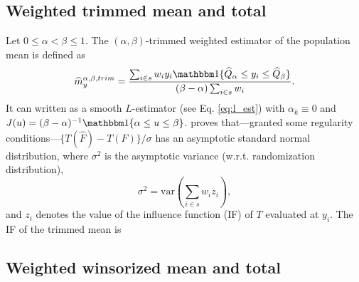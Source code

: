 \documentclass[a4paper,oneside,11pt,DIV=12]{scrartcl}
\newcommand{\indicator}{{\mathbbm 1}}   %
\theoremstyle{remark}
\begin{document}
\subsection{Weighted trimmed mean and total}
Let $0 \leq \alpha < \beta \leq 1$. The $(\alpha, \beta)$-trimmed weighted estimator of the population mean is defined as
\begin{equation*}
  \widehat{m}_y^{\alpha,\beta, trim} = \frac{\sum_{i \in s} w_i y_i \indicator \{\widehat{Q}_{\alpha} \leq y_i \leq \widehat{Q}_{\beta} \}}{(\beta - \alpha)\sum_{i \in s}w_i}.
\end{equation*}
\noindent It can written as a smooth $L$-estimator (see Eq. \ref{eq:l_est}) with $\alpha_k \equiv 0$ and $J(u) = (\beta - \alpha)^{-1} \indicator\{ \alpha \leq u \leq \beta \}$. \citet[][Thm. 1 and 2]{shao_1994} proves that---granted some regularity conditions---$\{T(\widehat{F}) - T(F)\} / \sigma$ has an asymptotic standard normal distribution, where $\sigma^2$ is the asymptotic variance (w.r.t. randomization distribution),
\begin{equation*}
    \sigma^2 = \mathrm{var} \left( \sum_{i \in s} w_i z_i \right),
\end{equation*}
\noindent and $z_i$ denotes the value of the influence function (IF) of $T$ evaluated at $y_i$. The IF of the trimmed mean is 



\subsection{Weighted winsorized mean and total}





\end{document}
